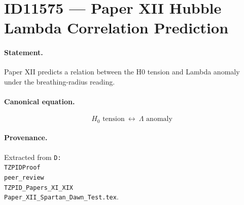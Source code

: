 \section*{ID11575 --- Paper XII Hubble Lambda Correlation Prediction}

\paragraph{Statement.}
Paper XII predicts a relation between the H0 tension and Lambda anomaly under the breathing-radius reading.

\paragraph{Canonical equation.}
\[
H_0\text{ tension}\ \longleftrightarrow\ \Lambda\text{ anomaly}
\]

\paragraph{Provenance.}
Extracted from \texttt{D:\\TZPIDProof\\peer\_review\\TZPID\_Papers\_XI\_XIX\\Paper\_XII\_Spartan\_Dawn\_Test.tex}.
